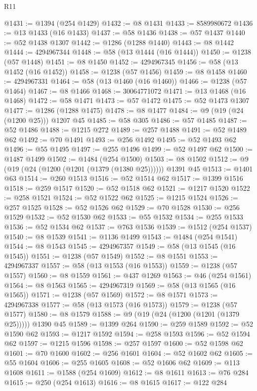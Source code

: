 \begin{lexlean}{R11}
\begin{coremodule}
@1431 := @1394 (@254 @1429)
@1432 := @8 @1431
@1433 := 8589980672
@1436 := @13 @1433 (@16 @1433)
@1437 := @58 @1436
@1438 := @57 @1437
@1440 := @52 @1438 @1307
@1442 := @1286 (@1288 @1440)
@1443 := @8 @1442
@1444 := 4294967344
@1448 := @58 (@13 @1444 (@16 @1444))
@1450 := @1238 (@57 @1448)
@1451 := @8 @1450
@1452 := 4294967345
@1456 := @58 (@13 @1452 (@16 @1452))
@1458 := @1238 (@57 @1456)
@1459 := @8 @1458
@1460 := 4294967331
@1464 := @58 (@13 @1460 (@16 @1460))
@1466 := @1238 (@57 @1464)
@1467 := @8 @1466
@1468 := 30064771072
@1471 := @13 @1468 (@16 @1468)
@1472 := @58 @1471
@1473 := @57 @1472
@1475 := @52 @1473 @1307
@1477 := @1286 (@1288 @1475)
@1478 := @8 @1477
@1484 := @9 (@19 (@24 (@1200 @25))) @1207 @45
@1485 := @58 @305
@1486 := @57 @1485
@1487 := @52 @1486
@1488 := @1215 @272
@1489 := @257 @1488
@1491 := @52 @1489 @62
@1492 := @70 @1491
@1493 := @256 @1492
@1495 := @52 @1493 @62
@1496 := @55 @1495
@1497 := @255 @1496
@1499 := @52 @1497 @62
@1500 := @1487 @1499
@1502 := @1484 (@254 @1500)
@1503 := @8 @1502
@1512 := @9 (@19 (@24 (@1200 (@1201 (@1379 (@1380 @25)))))) @1391 @45
@1513 := @1401 @63
@1514 := @260 @1513
@1516 := @52 @1514 @62
@1517 := @1399 @1516
@1518 := @259 @1517
@1520 := @52 @1518 @62
@1521 := @1217 @1520
@1522 := @258 @1521
@1524 := @52 @1522 @62
@1525 := @1215 @1524
@1526 := @257 @1525
@1528 := @52 @1526 @62
@1529 := @70 @1528
@1530 := @256 @1529
@1532 := @52 @1530 @62
@1533 := @55 @1532
@1534 := @255 @1533
@1536 := @52 @1534 @62
@1537 := @763 @1536
@1539 := @1512 (@254 @1537)
@1540 := @8 @1539
@1541 := @1136 @1499
@1543 := @1484 (@254 @1541)
@1544 := @8 @1543
@1545 := 4294967357
@1549 := @58 (@13 @1545 (@16 @1545))
@1551 := @1238 (@57 @1549)
@1552 := @8 @1551
@1553 := 4294967337
@1557 := @58 (@13 @1553 (@16 @1553))
@1559 := @1238 (@57 @1557)
@1560 := @8 @1559
@1561 := @437 @1269
@1563 := @46 (@254 @1561)
@1564 := @8 @1563
@1565 := 4294967319
@1569 := @58 (@13 @1565 (@16 @1565))
@1571 := @1238 (@57 @1569)
@1572 := @8 @1571
@1573 := 4294967338
@1577 := @58 (@13 @1573 (@16 @1573))
@1579 := @1238 (@57 @1577)
@1580 := @8 @1579
@1588 := @9 (@19 (@24 (@1200 (@1201 (@1379 @25))))) @1390 @45
@1589 := @1399 @264
@1590 := @259 @1589
@1592 := @52 @1590 @62
@1593 := @1217 @1592
@1594 := @258 @1593
@1596 := @52 @1594 @62
@1597 := @1215 @1596
@1598 := @257 @1597
@1600 := @52 @1598 @62
@1601 := @70 @1600
@1602 := @256 @1601
@1604 := @52 @1602 @62
@1605 := @55 @1604
@1606 := @255 @1605
@1608 := @52 @1606 @62
@1609 := @113 @1608
@1611 := @1588 (@254 @1609)
@1612 := @8 @1611
@1613 := @76 @284
@1615 := @250 (@254 @1613)
@1616 := @8 @1615
@1617 := @122 @284

\end{coremodule}
\end{lexlean}
